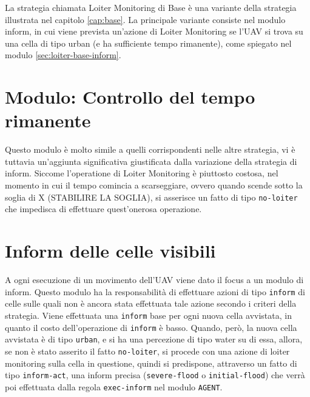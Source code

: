 La strategia chiamata Loiter Monitoring di Base è una variante della strategia illustrata nel capitolo \ref{cap:base}. La principale variante consiste nel modulo inform, in cui viene prevista un'azione di Loiter Monitoring se l'UAV si trova su una cella di tipo urban (e ha sufficiente tempo rimanente), come spiegato nel modulo \ref{sec:loiter-base-inform}.

\section{Modulo: Controllo del tempo rimanente} \label{sec:loiter-base-tempo}
Questo modulo è molto simile a quelli corrispondenti nelle altre strategia, vi è tuttavia un'aggiunta significativa giustificata dalla variazione della strategia di inform. Siccome l'operatione di Loiter Monitoring è piuttosto costosa, nel momento in cui il tempo comincia a scarseggiare, ovvero quando scende sotto la soglia di {\color{red}X (STABILIRE LA SOGLIA)}, si asserisce un fatto di tipo \texttt{no-loiter} che impedisca di effettuare quest'onerosa operazione.

\section{Inform delle celle visibili} \label{sec:loiter-rel-inform}
A ogni esecuzione di un movimento dell'UAV viene dato il focus a un modulo di inform. Questo modulo ha la responsabilità di effettuare azioni di tipo \texttt{inform} di celle sulle quali non è ancora stata effettuata tale azione secondo i criteri della strategia. Viene effettuata una \texttt{inform} base per ogni nuova cella avvistata, in quanto il costo dell'operazione di \texttt{inform} è basso. Quando, però, la nuova cella avvistata è di tipo \texttt{urban}, e si ha una percezione di tipo water su di essa, allora, se non è stato asserito il fatto \texttt{no-loiter}, si procede con una azione di loiter monitoring sulla cella in questione, quindi si predispone, attraverso un fatto di tipo \texttt{inform-act}, una inform precisa (\texttt{severe-flood} o \texttt{initial-flood}) che verrà poi effettuata dalla regola \texttt{exec-inform} nel modulo \texttt{AGENT}.

